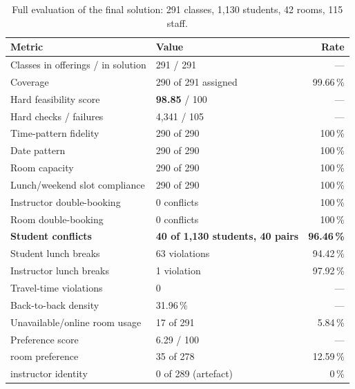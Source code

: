 \begin{table}[H]
\centering
\caption{Full evaluation of the final solution: 291 classes, 1{,}130 students, 42 rooms,
115 staff.}
\label{tab:final}
\footnotesize
\begin{tabular}{@{}L{6.6cm}L{4.0cm}r@{}}
\toprule
\textbf{Metric} & \textbf{Value} & \textbf{Rate} \\
\midrule
Classes in offerings / in solution    & 291 / 291        & --- \\
Coverage                              & 290 of 291 assigned & 99.66\,\% \\
Hard feasibility score                & \textbf{98.85} / 100 & --- \\
Hard checks / failures                & 4{,}341 / 105    & --- \\
Time-pattern fidelity                 & 290 of 290       & 100\,\% \\
Date pattern                          & 290 of 290       & 100\,\% \\
Room capacity                         & 290 of 290       & 100\,\% \\
Lunch/weekend slot compliance         & 290 of 290       & 100\,\% \\
Instructor double-booking             & 0 conflicts      & 100\,\% \\
Room double-booking                   & 0 conflicts      & 100\,\% \\
\textbf{Student conflicts}            & \textbf{40 of 1{,}130 students, 40 pairs} & \textbf{96.46\,\%} \\
Student lunch breaks                  & 63 violations    & 94.42\,\% \\
Instructor lunch breaks               & 1 violation      & 97.92\,\% \\
Travel-time violations                & 0                & --- \\
Back-to-back density                  & 31.96\,\%        & --- \\
Unavailable/online room usage         & 17 of 291        & 5.84\,\% \\
Preference score                      & 6.29 / 100       & --- \\
\quad room preference                 & 35 of 278        & 12.59\,\% \\
\quad instructor identity             & 0 of 289 (artefact) & 0\,\% \\
\bottomrule
\end{tabular}
\end{table}

